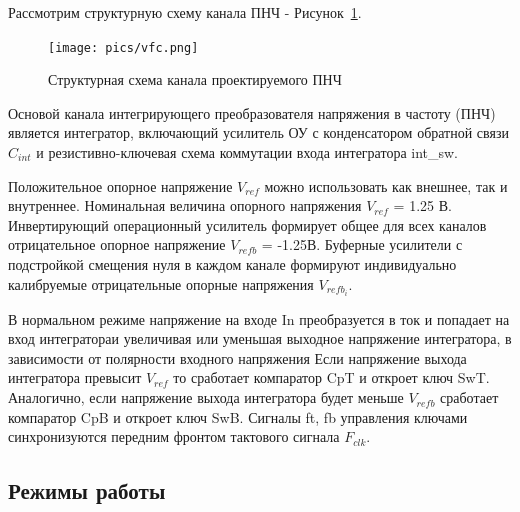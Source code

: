 \documentclass[a4paper,12pt,oneside]{scrartcl}
\begin{document}
Рассмотрим структурную схему канала ПНЧ - Рисунок~\ref{fig:VFC}. 

\begin{figure}[!htb]
\centering
\texttt{[image: pics/vfc.png]}
\caption{Структурная схема канала проектируемого ПНЧ}
\label{fig:VFC}
\end{figure}
\FloatBarrier

Основой канала интегрирующего преобразователя напряжения в частоту (ПНЧ) является интегратор, включающий усилитель ОУ с конденсатором обратной связи $C_{int}$ и резистивно-ключевая схема коммутации входа интегратора int\_sw. 

Положительное опорное напряжение $V_{ref}$ можно использовать как внешнее, так и внутреннее. Номинальная величина опорного напряжения $V_{ref}$ = 1.25 В.  Инвертирующий операционный усилитель формирует общее для всех каналов отрицательное опорное напряжение  $V_{refb}$ = -1.25В. Буферные усилители с подстройкой смещения нуля в каждом канале формируют индивидуально калибруемые отрицательные опорные напряжения $V_{refb_{i}}$. 

В нормальном режиме напряжение на входе In преобразуется в ток и попадает на вход интегратораи увеличивая или уменьшая выходное напряжение интегратора, в зависимости от полярности входного напряжения Если напряжение выхода интегратора превысит $V_{ref}$ то сработает компаратор CpT и откроет ключ SwT. Аналогично, если напряжение выхода интегратора будет меньше $V_{refb}$ сработает компаратор CpB и откроет ключ SwB. Сигналы ft, fb управления ключами синхронизуются передним фронтом тактового сигнала $F_{clk}$. 







\subsection{Режимы работы}
\end{document}
